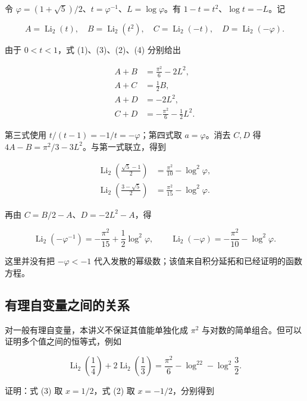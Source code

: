 \documentclass[11pt,a4paper]{article}
\begin{document}
令 \(\varphi=(1+\sqrt5)/2\)、\(t=\varphi^{-1}\)、\(L=\log\varphi\)。有 \(1-t=t^2\)、\(\log t=-L\)。记

\[
A=\operatorname{Li}_2(t),\quad B=\operatorname{Li}_2(t^2),\quad
C=\operatorname{Li}_2(-t),\quad D=\operatorname{Li}_2(-\varphi).
\]

由于 \(0<t<1\)，式 (1)、(3)、(2)、(4) 分别给出

\[
\begin{aligned}
A+B&=\frac{\pi^2}{6}-2L^2,\\
A+C&=\frac12B,\\
A+D&=-2L^2,\\
C+D&=-\frac{\pi^2}{6}-\frac12L^2.
\end{aligned}
\]

第三式使用 \(t/(t-1)=-1/t=-\varphi\)；第四式取 \(a=\varphi\)。消去 \(C,D\) 得 \(4A-B=\pi^2/3-3L^2\)。与第一式联立，得到

\[
\begin{aligned}
\operatorname{Li}_2\!\left(\frac{\sqrt5-1}{2}\right)
&=\frac{\pi^2}{10}-\log^2\varphi,\\
\operatorname{Li}_2\!\left(\frac{3-\sqrt5}{2}\right)
&=\frac{\pi^2}{15}-\log^2\varphi.
\end{aligned}
\]

再由 \(C=B/2-A\)、\(D=-2L^2-A\)，得

\[
\operatorname{Li}_2(-\varphi^{-1})=-\frac{\pi^2}{15}+\frac12\log^2\varphi,
\qquad
\operatorname{Li}_2(-\varphi)=-\frac{\pi^2}{10}-\log^2\varphi.
\]

这里并没有把 \(-\varphi<-1\) 代入发散的幂级数；该值来自积分延拓和已经证明的函数方程。

\hypertarget{ux6709ux7406ux81eaux53d8ux91cfux4e4bux95f4ux7684ux5173ux7cfb}{%
\subsection{有理自变量之间的关系}\label{ux6709ux7406ux81eaux53d8ux91cfux4e4bux95f4ux7684ux5173ux7cfb}}

对一般有理自变量，本讲义不保证其值能单独化成 \(\pi^2\) 与对数的简单组合。但可以证明多个值之间的恒等式，例如

\begin{equation}
\operatorname{Li}_2\!\left(\frac14\right)
+2\operatorname{Li}_2\!\left(\frac13\right)
=\frac{\pi^2}{6}-\log^22-\log^2\!\frac32.
\tag{6}
\end{equation}

证明：式 (3) 取 \(x=1/2\)，式 (2) 取 \(x=-1/2\)，分别得到
\end{document}
